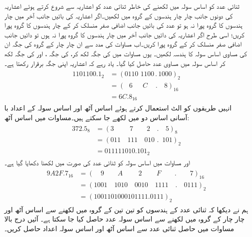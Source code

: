 	ثنائی عدد کو اساس سولہ میں لکھنے کی خاطر ثنائی عدد کو اعشاریہ سے شروع کرتے ہوئے اعشاریہ کی دونوں جانب چار چار ہندسوں کے گروہ میں لکھیں۔اگر اعشاریہ کی بائیں جانب آخر میں چار ہندسوں کا گروہ پورا نہ ہو تو عدد کی بائیں جانب اضافی صفر منسلک کر کے چار ہندسوں کا گروہ پورا کریں؛ اسی طرح اگر اعشاریہ کی دائیں جانب آخر میں چار ہندسوں کا گروہ پورا نہ ہوں تو دائیں جانب اضافی صفر منسلک کر کے گروہ پورا کریں۔اب مساوات  کی مدد سے ان چار چار کے گروہ کی جگہ ان کی مساوی اساس سولہ کا ہندسہ لکھیں۔ یوں مساوات  میں  کی جگہ  لکھ کر،  کی جگہ ، اور  کی جگہ  لکھ کر اساس سولہ میں مساوی عدد حاصل کیا گیا۔ یاد رہے کہ اعشاریہ اپنی جگہ برقرار رکھتا ہے۔
\begin{gather}
\begin{aligned}\label{مساوات_ثنائی_سولہ_تبدیل}
1101100.1_2&=(0110 \,\,1100\, . \, 1000)_2\\
&=(\phantom{0}\, 6\,\,\quad \,C\quad\, .\quad 8)_{16}\\
&=6C.8_{16}
\end{aligned}
\end{gather}
انہیں طریقوں کو الٹ استعمال کرتے ہوئے اساس آٹھ اور اساس سولہ کے اعداد با آسانی اساس دو میں لکھے جا سکتے ہیں۔مساوات  میں اساس آٹھ:
 \begin{gather}
 \begin{aligned}\label{مساوات_ثنائی_آٹھ_تبدیل_اساس}
 372.5_8&=(3\quad\quad \,\, 7\quad\quad 2\quad . \quad 5)_8\\
 &=(011\quad 111 \quad 010\,\,. \,\,\, 101)_2\\
 &=011111010.101_2
 \end{aligned}
 \end{gather}
 اور مساوات  میں اساس سولہ کو ثنائی عدد کی صورت میں لکھنا دکھایا گیا ہے۔ 
\begin{gather}
 \begin{aligned}\label{مساوات_ثنائی_سولہ_تبدیل_اساس}
 9A2F.7_{16}&=(\quad 9 \quad \quad A\quad\quad \,\, 2\quad \quad \, F\quad \quad . \quad \quad 7)_{16}\\
 &=(1001\quad 1010\quad 0010\quad 1111\quad . \quad 0111)_2\\
 &=(1001101000101111.0111)_2
 \end{aligned}
 \end{gather}
ہم نے دیکھا کہ ثنائی عدد کے ہندسوں کو تین تین کے گروہ میں لکھنے سے اساس آٹھ اور چار چار کے گروہ میں لکھنے سے اساس سولہ عدد حاصل کیا جا سکتا ہے۔ آئیں درج بالا مساوات میں حاصل ثنائی عدد سے اساس آٹھ اور اساس سولہ اعداد حاصل کریں۔
